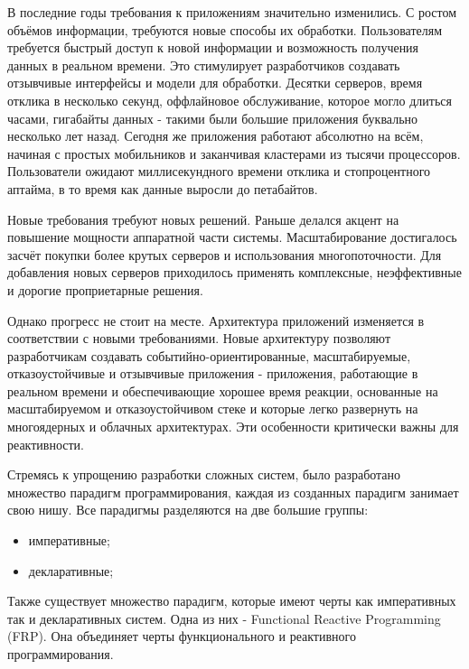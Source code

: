 \label{sec:intro}

В последние годы требования к приложениям значительно изменились. С ростом объёмов информации, требуются новые способы их обработки. Пользователям требуется быстрый доступ к новой информации и возможность получения данных в реальном времени. Это стимулирует разработчиков создавать отзывчивые интерфейсы и модели для обработки. Десятки серверов, время отклика в несколько секунд, оффлайновое обслуживание, которое могло длиться часами, гигабайты данных - такими были большие приложения буквально несколько лет назад. Сегодня же приложения работают абсолютно на всём, начиная с простых мобильников и заканчивая кластерами из тысячи процессоров. Пользователи ожидают миллисекундного времени отклика и стопроцентного аптайма, в то время как данные выросли до петабайтов.

Новые требования требуют новых решений. Раньше делался акцент на повышение мощности аппаратной части системы. Масштабирование достигалось засчёт покупки более крутых серверов и использования многопоточности. Для добавления новых серверов приходилось применять комплексные, неэффективные и дорогие проприетарные решения.

Однако прогресс не стоит на месте. Архитектура приложений изменяется в соответствии с новыми требованиями. Новые архитектуру позволяют разработчикам создавать событийно-ориентированные, масштабируемые, отказоустойчивые и отзывчивые приложения - приложения, работающие в реальном времени и обеспечивающие хорошее время реакции, основанные на масштабируемом и отказоустойчивом стеке и которые легко развернуть на многоядерных и облачных архитектурах. Эти особенности критически важны для реактивности.

Стремясь к упрощению разработки сложных систем, было разработано множество парадигм программирования, каждая из созданных парадигм занимает свою нишу. Все парадигмы разделяются на две большие группы:

\begin{itemize}
  \item императивные;
  \item декларативные;
\end{itemize}

Также существует множество парадигм, которые имеют черты как императивных так и декларативных систем. Одна из них - Functional Reactive Programming (FRP). Она объединяет черты функционального и реактивного программирования.

